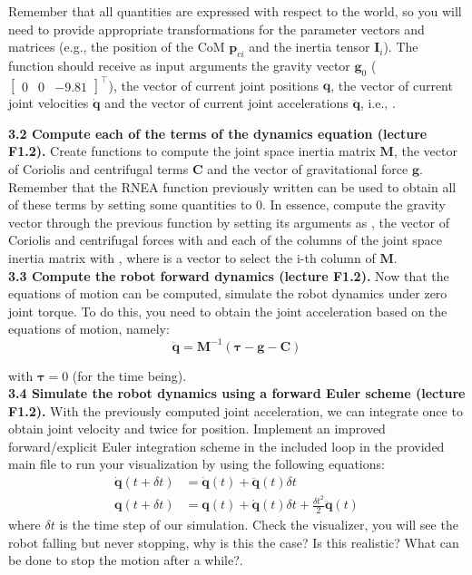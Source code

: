 \documentclass[11pt]{article}
\begin{document}
Remember that all quantities are expressed with respect to the world, so you will need to provide appropriate transformations for the parameter vectors and matrices (e.g., the position of the CoM $\mathbf{p}_{ci}$ and the inertia tensor $\mathbf{I}_i$). The function  should receive as input arguments the gravity vector $\mathbf{g}_0$ ($\begin{bmatrix}
	0 & 0 & -9.81
\end{bmatrix}^{\top}$), the vector of current joint positions $\mathbf{q}$, the vector of current joint velocities $\dot{\mathbf{q}}$ and the vector of current joint accelerations $\ddot{\mathbf{q}}$, i.e.,
. 

\textbf{3.2 Compute each of the terms of the dynamics equation (lecture F1.2). } Create functions to compute the joint space inertia matrix $\mathbf{M}$, the vector of Coriolis and centrifugal terms $\mathbf{C}$ and the vector of gravitational force $\mathbf{g}$. Remember that the RNEA function previously written can be used to obtain all of these terms by setting some quantities to 0. In essence, compute the gravity vector through the previous function by setting its arguments as , the vector of Coriolis and centrifugal forces with  and each of the columns of the joint space inertia matrix with , where  is a vector to select the i-th column of $\mathbf{M}$.\\


\textbf{3.3 Compute the robot forward dynamics (lecture F1.2).} Now that the equations of motion can be computed, simulate the robot dynamics under zero joint torque. To do this, you need to obtain the joint acceleration based on the equations of motion, namely:
%
\begin{equation*}
	\ddot{\mathbf{q}} = \mathbf{M}^{-1} (\boldsymbol{\tau} - \mathbf{g} - \mathbf{C})
\end{equation*}

with $\boldsymbol{\tau} = 0$ (for the time being). \\




\textbf{3.4 Simulate the robot dynamics using a forward Euler scheme (lecture F1.2).} With the previously computed joint acceleration, we can integrate once to obtain joint velocity and twice for position. Implement an improved forward/explicit Euler integration scheme in the included  loop in the provided main file to run your visualization  by using the following equations:
\begin{align*}
	\dot{\mathbf{q}}(t  + \delta t) &= \dot{\mathbf{q}} (t) + \ddot{\mathbf{q}}(t) \delta t \\
	\mathbf{q}(t +\delta t) &= \mathbf{q}(t) + \dot{\mathbf{q}} (t) \delta t + \frac{\delta t^2}{2}\ddot{\mathbf{q}}(t)
\end{align*}
 where $\delta t$ is the time step of our simulation. Check the visualizer, you will see the robot falling but never stopping, why is this the case? Is this realistic? What can be done to stop the motion after a while?. 
 
\end{document}
